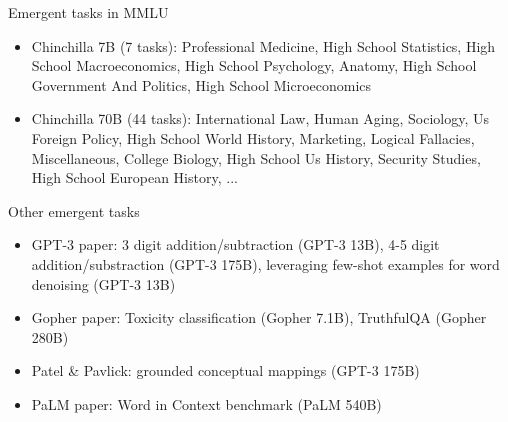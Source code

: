 
\begin{vbframe}{Emergent tasks in MMLU}

\vfill

\begin{itemize}
    \item Chinchilla 7B (7 tasks): Professional Medicine, High School Statistics, High School Macroeconomics, High School Psychology, Anatomy, High School Government And Politics, High School Microeconomics
    \item Chinchilla 70B (44 tasks): International Law, Human Aging, Sociology, Us Foreign Policy, High School World History, Marketing, Logical Fallacies, Miscellaneous, College Biology, High School Us History, Security Studies, High School European History, ...
\end{itemize}

\vfill

\end{vbframe}


\begin{vbframe}{Other emergent tasks}

\vfill

\begin{itemize}
    \item GPT-3 paper: 3 digit addition/subtraction (GPT-3 13B), 4-5 digit addition/substraction (GPT-3 175B), leveraging few-shot examples for word denoising (GPT-3 13B)
    \item Gopher paper: Toxicity classification (Gopher 7.1B), TruthfulQA (Gopher 280B)
    \item Patel \& Pavlick: grounded conceptual mappings (GPT-3 175B)
    \item PaLM paper: Word in Context benchmark (PaLM 540B)
\end{itemize}

\vfill

\end{vbframe}





